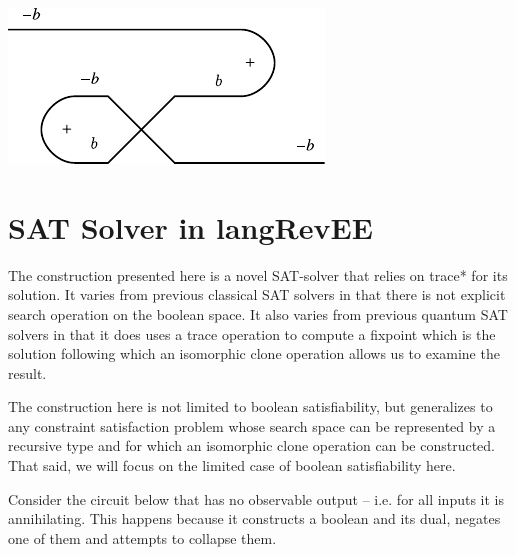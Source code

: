 \documentclass[preprint]{sigplanconf}
\begin{document}
\begin{itemize}
\begin{center}
  \includegraphics{diagrams/neg_circuit2.pdf}
\end{center}

\end{itemize}


\section{SAT Solver in {{langRevEE}} }
\label{sec:prog}

\label{sec:sat-solver}

The construction presented here is a novel SAT-solver that relies on
{{trace*}} for its solution. It varies from previous classical SAT
solvers in that there is not explicit search operation on the boolean
space. It also varies from previous quantum SAT solvers in that it
does uses a {{trace}} operation to compute a fixpoint which is the
solution following which an isomorphic clone operation allows us to
examine the result.

The construction here is not limited to boolean satisfiability, but
generalizes to any constraint satisfaction problem whose search space
can be represented by a recursive type and for which an isomorphic
clone operation can be constructed. That said, we will focus on the
limited case of boolean satisfiability here. 

Consider the circuit below that has no observable output -- i.e. for
all inputs it is annihilating. This happens because it constructs a
boolean and its dual, negates one of them and attempts to collapse
them.
\begin{center}
\end{center}  
\end{document}
